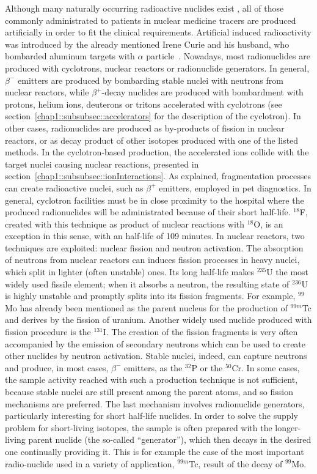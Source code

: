 Although many naturally occurring radioactive nuclides exist , all of those commonly administrated to patients in nuclear medicine tracers are produced artificially in order to fit the clinical requirements. Artificial induced radioactivity was introduced by the already mentioned Irene Curie and his husband, who bombarded aluminum targets with $\alpha$ particle~\parencite{Leone2010}. Nowadays, most radionuclides are produced with cyclotrons, nuclear reactors or radionuclide generators. In general, $\beta^-$ emitters are produced by bombarding stable nuclei with neutrons from nuclear reactors, while $\beta^+$-decay nuclides are produced with bombardment with protons, helium ions, deuterons or tritons accelerated with cyclotrons (see section~\ref{chap1::subsubsec::accelerators} for the description of the cyclotron). In other cases, radionuclides are produced as by-products of fission in nuclear reactors, or as decay product of other isotopes produced with one of the listed methods. 
In the cyclotron-based production, the accelerated ions collide with the target nuclei causing nuclear reactions, presented in section~\ref{chap1::subsubsec::ionInteractions}. As explained, fragmentation processes can create radioactive nuclei, such as $\beta^+$ emitters, employed in \gls{pet} diagnostics. In general, cyclotron facilities must be in close proximity to the hospital where the produced radionuclides will be administrated because of their short half-life. $^{18}$F, created with this technique as product of nuclear reactions with $^{18}$O, is an exception in this sense, with an half-life of 109 minutes. 
In nuclear reactors, two techniques are exploited: nuclear fission and neutron activation. The absorption of neutrons from nuclear reactors can induces fission processes in heavy nuclei, which split in lighter (often unstable) ones. Its long half-life makes $^{235}$U the most widely used fissile element; when it absorbs a neutron, the resulting state of $^{236}$U is highly unstable and promptly splits into its fission fragments. For example, $^{99}$Mo has already been mentioned as the parent nucleus for the production of  $^{99m}$Tc and derives by the fission of uranium. Another widely used nuclide produced with fission procedure is the $^{131}$I. The creation of the fission fragments is very often accompanied by the emission of secondary neutrons which can be used to create other nuclides by neutron activation. Stable nuclei, indeed, can capture neutrons and produce, in most cases, $\beta^-$ emitters, as the $^{32}$P or the $^{50}$Cr. In some cases, the sample activity reached with such a production technique is not sufficient, because stable nuclei are still present among the parent atoms, and so fission mechanisms are preferred. 
The last mechanism involves radionuclide generators, particularly interesting for short half-life nuclides. In order to solve the supply problem for short-living isotopes, the sample is often prepared with the longer-living parent nuclide (the so-called \enquote{generator}), which then decays in the desired one continually providing it. This is for example the case of the most important radio-nuclide used in a variety of application, $^{99m}$Tc, result of the decay of $^{99}$Mo. 

